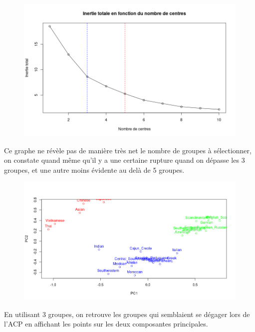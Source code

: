 \documentclass[a4paper, titlepage]{report}
\begin{document}
\begin{figure}[h]
	\begin{center}
		\includegraphics[scale = 0.32]{./doc/plot-kmeans-mininertie.png}
	\end{center}
\end{figure}

Ce graphe ne révèle pas de manière très net le nombre de groupes à sélectionner, on constate quand même qu'il y a une certaine rupture quand on dépasse les 3 groupes, et une autre moins évidente au delà de 5 groupes. 

\begin{figure}[h]
	\begin{center}
		\includegraphics[scale = 0.32]{./doc/plot-kmeans-3.png}
	\end{center}
\end{figure}

En utilisant 3 groupes, on retrouve les groupes qui semblaient se dégager lors de l'ACP en affichant les points sur les deux composantes principales. 
\end{document}
